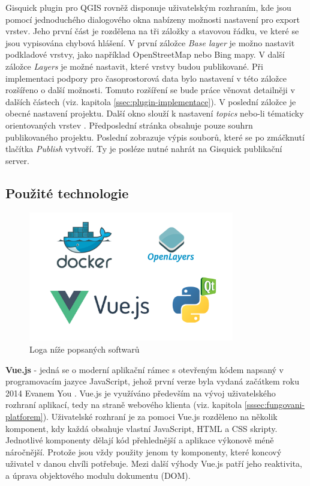 Gisquick plugin pro QGIS rovněž disponuje uživatelským rozhraním, kde jsou
pomocí jednoduchého dialogového okna nabízeny možnosti nastavení
pro export vrstev. Jeho první část je rozdělena na tři záložky a
stavovou řádku, ve které se jsou vypisována chybová hlášení. V
první záložce \textit{Base layer} je možno nastavit podkladové vrstvy,
jako například OpenStreetMap nebo Bing mapy. V další záložce
\textit{Layers} je možné nastavit, které vrstvy budou publikované. Při
implementaci podpory pro časoprostorová data bylo nastavení v této
záložce rozšířeno o další možnosti. Tomuto rozšíření se bude
práce věnovat detailněji v dalších částech (viz. kapitola \ref{ssec:plugin-implementace}). V poslední záložce je
obecné nastavení projektu. Další okno slouží k nastavení \textit{topics}
nebo-li tématicky orientovaných vrstev \cite{gisquick-manual}. Předposlední
stránka obsahuje pouze souhrn publikovaného projektu. Poslední zobrazuje
výpis souborů, které se po zmáčknutí tlačítka \textit{Publish}
vytvoří. Ty je posléze nutné nahrát na Gisquick publikační server.

\newpage
\subsection{Použité technologie}

\begin{figure}[h!]
\centering
\includegraphics[width=0.8\textwidth]{./img/technologies.png}
\caption{Loga níže popsaných softwarů}
\label{fig:technoogies}
\end{figure}

\noindent
\textbf{Vue.js} - jedná se o moderní aplikační rámec s otevřeným kódem
napsaný v programovacím jazyce JavaScript, jehož první verze byla vydaná
začátkem roku 2014 Evanem You \cite{vue-history}. Vue.js je využíváno především
na vývoj uživatelského rozhraní aplikací, tedy na straně webového klienta
(viz. kapitola \ref{sssec:fungovani-platforem}). Uživatelské rozhraní
je za pomoci Vue.js rozděleno na několik  komponent, kdy každá obsahuje
vlastní JavaScript, HTML a CSS skripty. Jednotlivé komponenty dělají kód
přehlednější a aplikace výkonově méně náročnější. Protože jsou vždy
použity jenom ty komponenty, které koncový uživatel v danou chvíli
potřebuje. Mezi další výhody Vue.js patří 
jeho reaktivita, a úprava objektového modulu dokumentu (DOM).

